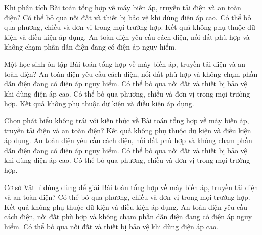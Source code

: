 \begin{ex}
Khi phân tích Bài toán tổng hợp về máy biến áp, truyền tải điện và an toàn điện?
\choice
{Có thể bỏ qua nối đất và thiết bị bảo vệ khi dùng điện áp cao.}
{Có thể bỏ qua phương, chiều và đơn vị trong mọi trường hợp.}
{Kết quả không phụ thuộc dữ kiện và điều kiện áp dụng.}
{\True An toàn điện yêu cầu cách điện, nối đất phù hợp và không chạm phần dẫn điện đang có điện áp nguy hiểm.}
\end{ex}

\begin{ex}
Một học sinh ôn tập Bài toán tổng hợp về máy biến áp, truyền tải điện và an toàn điện?
\choice
{\True An toàn điện yêu cầu cách điện, nối đất phù hợp và không chạm phần dẫn điện đang có điện áp nguy hiểm.}
{Có thể bỏ qua nối đất và thiết bị bảo vệ khi dùng điện áp cao.}
{Có thể bỏ qua phương, chiều và đơn vị trong mọi trường hợp.}
{Kết quả không phụ thuộc dữ kiện và điều kiện áp dụng.}
\end{ex}

\begin{ex}
Chọn phát biểu không trái với kiến thức về Bài toán tổng hợp về máy biến áp, truyền tải điện và an toàn điện?
\choice
{Kết quả không phụ thuộc dữ kiện và điều kiện áp dụng.}
{\True An toàn điện yêu cầu cách điện, nối đất phù hợp và không chạm phần dẫn điện đang có điện áp nguy hiểm.}
{Có thể bỏ qua nối đất và thiết bị bảo vệ khi dùng điện áp cao.}
{Có thể bỏ qua phương, chiều và đơn vị trong mọi trường hợp.}
\end{ex}

\begin{ex}
Cơ sở Vật lí đúng dùng để giải Bài toán tổng hợp về máy biến áp, truyền tải điện và an toàn điện?
\choice
{Có thể bỏ qua phương, chiều và đơn vị trong mọi trường hợp.}
{Kết quả không phụ thuộc dữ kiện và điều kiện áp dụng.}
{\True An toàn điện yêu cầu cách điện, nối đất phù hợp và không chạm phần dẫn điện đang có điện áp nguy hiểm.}
{Có thể bỏ qua nối đất và thiết bị bảo vệ khi dùng điện áp cao.}
\end{ex}

